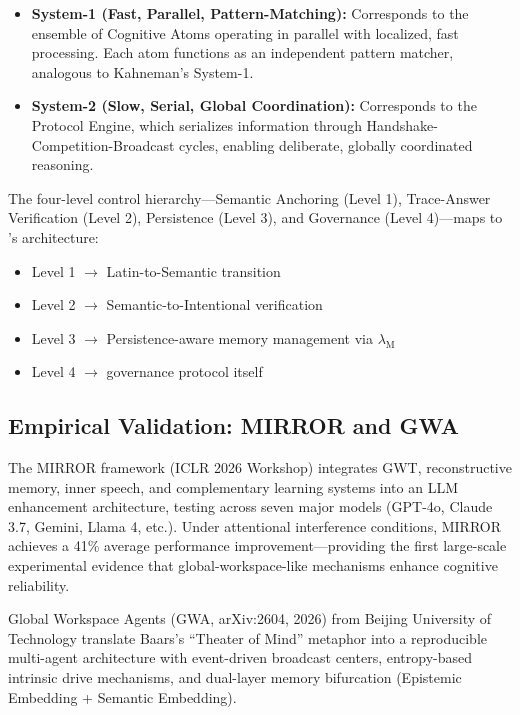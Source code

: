 \documentclass[11pt,a4paper]{article}
\theoremstyle{definition}
\theoremstyle{remark}
\newcommand{\CAA}{\text{CAA-X}}
\newcommand{\CML}{\text{CML 2.0}}
\newcommand{\GWP}{\text{GWP}}
\newcommand{\lambdaM}{\lambda_{\text{M}}}
\begin{document}
\begin{itemize}
    \item \textbf{System-1 (Fast, Parallel, Pattern-Matching):} Corresponds to the ensemble of Cognitive Atoms operating in parallel with localized, fast processing. Each atom functions as an independent pattern matcher, analogous to Kahneman's System-1.
    \item \textbf{System-2 (Slow, Serial, Global Coordination):} Corresponds to the \GWP{} Protocol Engine, which serializes information through Handshake-Competition-Broadcast cycles, enabling deliberate, globally coordinated reasoning.
\end{itemize}

The four-level control hierarchy---Semantic Anchoring (Level 1), Trace-Answer Verification (Level 2), Persistence (Level 3), and Governance (Level 4)---maps to \CAA{}'s architecture:
\begin{itemize}
    \item Level 1 $\rightarrow$ \CML{} Latin-to-Semantic transition
    \item Level 2 $\rightarrow$ \CML{} Semantic-to-Intentional verification
    \item Level 3 $\rightarrow$ Persistence-aware memory management via $\lambdaM$
    \item Level 4 $\rightarrow$ \GWP{} governance protocol itself
\end{itemize}

\subsection{Empirical Validation: MIRROR and GWA}\label{subsec:mirror-gwa}

The MIRROR framework (ICLR 2026 Workshop) integrates GWT, reconstructive memory, inner speech, and complementary learning systems into an LLM enhancement architecture, testing across seven major models (GPT-4o, Claude 3.7, Gemini, Llama 4, etc.). Under attentional interference conditions, MIRROR achieves a 41\% average performance improvement---providing the first large-scale experimental evidence that global-workspace-like mechanisms enhance cognitive reliability.

Global Workspace Agents (GWA, arXiv:2604, 2026) from Beijing University of Technology translate Baars's ``Theater of Mind'' metaphor into a reproducible multi-agent architecture with event-driven broadcast centers, entropy-based intrinsic drive mechanisms, and dual-layer memory bifurcation (Epistemic Embedding + Semantic Embedding).
\end{document}
